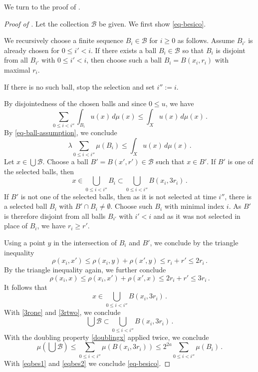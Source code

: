 \documentclass[10pt,a4paper]{article}
\theoremstyle{plain}
\theoremstyle{definition}
\numberwithin{equation}{subsection}
\newcommand{\proves}[1]{}
\newcommand{\leanok}{}
\begin{document}
We turn to the proof of .
\begin{proof}[Proof of ]
\leanok
\proves{Hardy-Littlewood}
Let the collection $\mathcal{B}$ be given.
We first show \eqref{eq-besico}.

We recursively choose a finite sequence $B_i\in \mathcal{B}$
for $i\ge 0$ as follows. Assume $B_{i'}$
is already chosen for $0\le i'<i$.
If there exists a ball $B_{i}\in \mathcal{B}$ so that $B_{i}$
is disjoint from all $B_{i'}$
with $0\le i'<i$, then choose
such a ball $B_i=B(x_i,r_i)$ with maximal $r_i$.

If there is no such ball, stop the selection and set
$i'':=i$.

By disjointedness of the chosen balls and since $0 \le u$, we have
\begin{equation}
\sum_{0\le i<i''}\int_{B_i} u(x)\, d\mu(x) \le \int_X u(x)\, d\mu(x)\, .
\end{equation}
By \eqref{eq-ball-assumption}, we conclude
\begin{equation}\label{eqbes1}
\lambda \sum_{0\le i<i''}\mu(B_i)
\le \int_X u(x)\, d\mu(x)\, .
\end{equation}
Let $x\in \bigcup \mathcal{B}$.
Choose a ball $B'=B(x',r')\in \mathcal{B}$
such that $x\in B'$.
If $B'$ is one of the selected balls, then
\begin{equation}\label{3rone}
    x\in \bigcup _{0\le i< i''}B_i\subset \bigcup _{0\le i< i''}B(x_i,3r_i)\, .
\end{equation}
If $B'$ is not one of the selected balls, then as it is not selected at time $i''$, there is a selected ball $B_i$ with
$B'\cap B_i\neq \emptyset$.
Choose such $B_i$ with minimal index $i$. As $B'$ is therefore disjoint from all
balls $B_{i'}$ with $i'<i$ and
as it was not selected in place of $B_i$, we have $r_i\ge r'$.

Using a point $y$ in the intersection of $B_i$ and $B'$,
we conclude by the triangle inequality
\begin{equation}
   \rho(x_i,x')\le \rho(x_i,y)+\rho(x',y)\le r_i+r'\le 2r_i \, .
\end{equation}
By the triangle inequality again, we further conclude
\begin{equation}
   \rho(x_i,x)\le \rho(x_i,x')+\rho(x',x)\le 2r_i+r'\le 3r_i \, .
\end{equation}
It follows that
\begin{equation}\label{3rtwo}
    x\in \bigcup _{0\le i< i''}B(x_i,3r_i)\, .
\end{equation}
With \eqref{3rone} and \eqref{3rtwo}, we conclude
\begin{equation}
\bigcup \mathcal{B}\subset
\bigcup _{0\le i< i''}B(x_i,3r_i)\, .
\end{equation}
With the doubling property
\eqref{doublingx} applied twice, we conclude
\begin{equation}\label{eqbes2}
    \mu(\bigcup{\mathcal{B}})
    \le \sum _{0\le i< i''}\mu (B(x_i,3r_i))
    \le 2^{2a}\sum _{0\le i< i''}\mu (B_i)\, .
\end{equation}
With \eqref{eqbes1} and \eqref{eqbes2} we conclude
\eqref{eq-besico}.



\end{proof}
\end{document}
